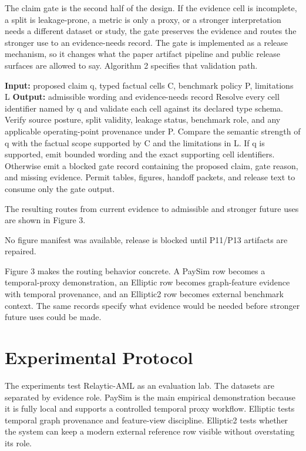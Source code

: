 \documentclass[11pt]{article}
\begin{document}
The claim gate is the second half of the design. If the evidence cell is incomplete, a split is leakage-prone, a metric is only a proxy, or a stronger interpretation needs a different dataset or study, the gate preserves the evidence and routes the stronger use to an evidence-needs record. The gate is implemented as a release mechanism, so it changes what the paper artifact pipeline and public release surfaces are allowed to say. Algorithm 2 specifies that validation path.

\begin{algorithm}[H]
\caption{Claim-gate validation}
\begin{algorithmic}[1]
\State \textbf{Input:} proposed claim q, typed factual cells C, benchmark policy P, limitations L
\State \textbf{Output:} admissible wording and evidence-needs record
\State Resolve every cell identifier named by q and validate each cell against its declared type schema.
\State Verify source posture, split validity, leakage status, benchmark role, and any applicable operating-point provenance under P.
\State Compare the semantic strength of q with the factual scope supported by C and the limitations in L.
\State If q is supported, emit bounded wording and the exact supporting cell identifiers.
\State Otherwise emit a blocked gate record containing the proposed claim, gate reason, and missing evidence.
\State Permit tables, figures, handoff packets, and release text to consume only the gate output.
\end{algorithmic}
\end{algorithm}


The resulting routes from current evidence to admissible and stronger future uses are shown in Figure 3.

No figure manifest was available, release is blocked until P11/P13 artifacts are repaired.

Figure 3 makes the routing behavior concrete. A PaySim row becomes a temporal-proxy demonstration, an Elliptic row becomes graph-feature evidence with temporal provenance, and an Elliptic2 row becomes external benchmark context. The same records specify what evidence would be needed before stronger future uses could be made.

\section{Experimental Protocol}

The experiments test Relaytic-AML as an evaluation lab. The datasets are separated by evidence role. PaySim is the main empirical demonstration because it is fully local and supports a controlled temporal proxy workflow. Elliptic tests temporal graph provenance and feature-view discipline. Elliptic2 tests whether the system can keep a modern external reference row visible without overstating its role.
\end{document}
